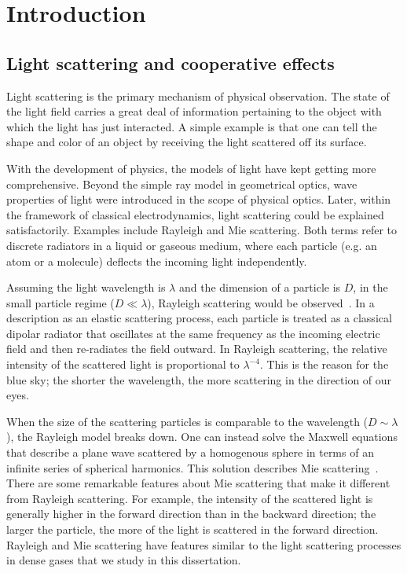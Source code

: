 \chapter{Introduction}

\section{Light scattering and cooperative effects}

Light scattering is the primary mechanism of physical observation. The state of the light field carries a great deal of information pertaining to the object with which the light has just interacted. A simple example is that one can tell the shape and color of an object by receiving the light scattered off its surface.

 
With the development of physics, the models of light have kept getting more comprehensive. Beyond the simple ray model in geometrical optics, wave properties of light were introduced in the scope of physical optics. Later, within the framework of classical electrodynamics, light scattering could be explained satisfactorily. Examples include Rayleigh and Mie scattering. Both terms refer to discrete radiators in a liquid or gaseous medium, where each particle (e.g. an atom or a molecule) deflects the incoming light independently.

Assuming the light wavelength is $\lambda$ and the dimension of a particle is $D$, in the small particle regime ($D\ll\lambda$), Rayleigh scattering would be observed~\cite{Lilienfeld:04}. In a description as an elastic scattering process, each particle is treated as a classical dipolar radiator that oscillates at the same frequency as the incoming electric field and then re-radiates the field outward. In Rayleigh scattering, the relative intensity of the scattered light is proportional to $\lambda^{-4}$. This is the reason for the blue sky; the shorter the wavelength, the more scattering in the direction of our eyes.

When the size of the scattering particles is comparable to the wavelength ($D\sim\lambda$), the Rayleigh model breaks down. One can instead solve the Maxwell equations that describe a plane wave scattered by a homogenous sphere in terms of an infinite series of spherical harmonics. This solution describes Mie scattering~\cite{1908AnP...330..377M}.  There are some remarkable features about Mie scattering that make it different from Rayleigh scattering. For example, the intensity of the scattered light is generally higher in the forward direction than in the backward direction; the larger the particle, the more of the light is scattered in the forward direction. Rayleigh and Mie scattering have features similar to the light scattering processes in dense gases that we study in this dissertation.

